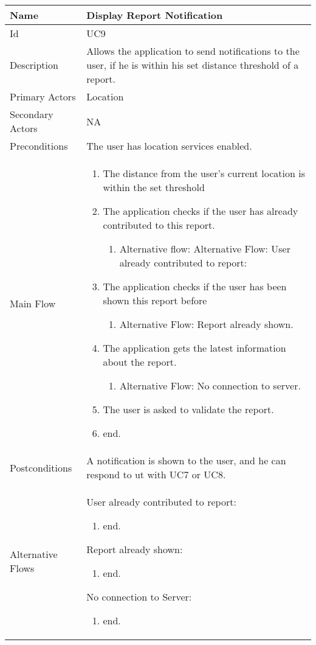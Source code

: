 \begin{tabularx}{\textwidth}{|l|X|}
\hline
Name              & Display Report Notification \\ \hline 
Id                & UC9 \\ \hline
Description       & Allows the application to send notifications to the user, if he is within his set distance threshold of a report. \\ \hline
Primary Actors    & Location \\ \hline
Secondary Actors  & NA \\ \hline
Preconditions     & The user has location services enabled. \\ \hline
Main Flow         &
{\footnotesize \begin{enumerate}
\item The distance from the user’s current location is within the set threshold
\item The application checks if the user has already contributed to this report.
\begin{enumerate}
\item Alternative flow: Alternative Flow: User already contributed to report:
\end{enumerate}
\item The application checks if the user has been shown this report before
\begin{enumerate}
\item Alternative Flow: Report already shown.
\end{enumerate}
\item The application gets the latest information about the report.
\begin{enumerate}
\item Alternative Flow: No connection to server.
\end{enumerate}
\item The user is asked to validate the report.
\item end.
\end{enumerate}} \\ \hline
Postconditions    & A notification is shown to the user, and he can respond to ut with UC7 or UC8. \\ \hline
Alternative Flows & 
User already contributed to report:
{\footnotesize \begin{enumerate}
\item end.
\end{enumerate}}
Report already shown:
{\footnotesize \begin{enumerate}
\item end.
\end{enumerate}}
No connection to Server:
{\footnotesize \begin{enumerate}
\item end.
\end{enumerate}}
\\ \hline
\end{tabularx}

